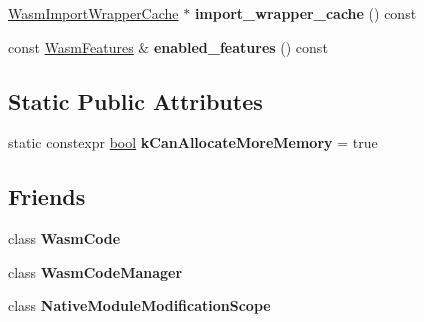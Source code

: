 \begin{DoxyCompactItemize}
\item 
\mbox{\label{classv8_1_1internal_1_1wasm_1_1NativeModule_a56f00bc0f4803105298a4a7de67bce46}} 
\mbox{\hyperlink{classv8_1_1internal_1_1wasm_1_1WasmImportWrapperCache}{Wasm\+Import\+Wrapper\+Cache}} $\ast$ {\bfseries import\+\_\+wrapper\+\_\+cache} () const
\item 
\mbox{\label{classv8_1_1internal_1_1wasm_1_1NativeModule_aa56d79eed88a12fc6b03a842b822cf99}} 
const \mbox{\hyperlink{structv8_1_1internal_1_1wasm_1_1WasmFeatures}{Wasm\+Features}} \& {\bfseries enabled\+\_\+features} () const
\end{DoxyCompactItemize}
\subsection*{Static Public Attributes}
\begin{DoxyCompactItemize}
\item 
\mbox{\label{classv8_1_1internal_1_1wasm_1_1NativeModule_aa7c69a1e088e8649b270101b27f16a02}} 
static constexpr \mbox{\hyperlink{classbool}{bool}} {\bfseries k\+Can\+Allocate\+More\+Memory} = true
\end{DoxyCompactItemize}
\subsection*{Friends}
\begin{DoxyCompactItemize}
\item 
\mbox{\label{classv8_1_1internal_1_1wasm_1_1NativeModule_a0ec92359918c6ef6fe010cafb580eb86}} 
class {\bfseries Wasm\+Code}
\item 
\mbox{\label{classv8_1_1internal_1_1wasm_1_1NativeModule_a07083c066ffccdb3af5b8a33f626fdb2}} 
class {\bfseries Wasm\+Code\+Manager}
\item 
\mbox{\label{classv8_1_1internal_1_1wasm_1_1NativeModule_ac921996be779e252a5667657d9b5f762}} 
class {\bfseries Native\+Module\+Modification\+Scope}
\end{DoxyCompactItemize}


